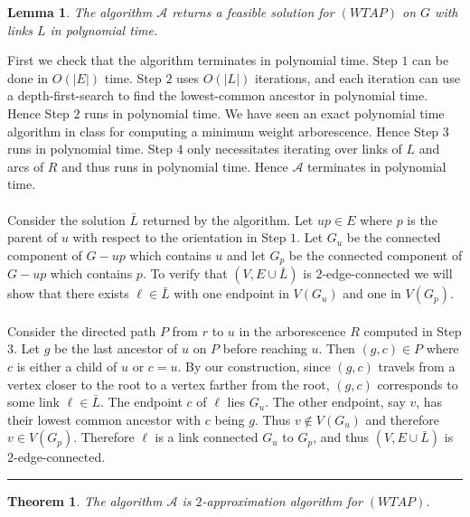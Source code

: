 \documentclass[letterpaper,12pt,oneside,onecolumn]{article}
\newcommand{\cA}{\mathcal{A}} \newcommand{\cB}{\mathcal{B}}
\newenvironment{proof}{{\bf Proof:  }}{\hfill\rule{2mm}{2mm}}
\newtheorem{lemma}[fact]{Lemma}
\newtheorem{theorem}[fact]{Theorem}
\begin{document}
\begin{lemma}\label{lemma:3a-poly}
The algorithm $\cA$ returns a feasible solution for $(WTAP)$ on $G$ with links $L$ in polynomial time.
\end{lemma}
\begin{proof}
First we check that the algorithm terminates in polynomial time. Step $1$ can be done in $O(|E|)$ time. Step $2$ uses $O(|L|)$ iterations, and each iteration can use a depth-first-search to find the lowest-common ancestor in polynomial time. Hence Step $2$ runs in polynomial time. We have seen an exact polynomial time algorithm in class for computing a minimum weight arborescence. Hence Step $3$ runs in polynomial time. Step $4$ only necessitates iterating over links of $L$ and arcs of $R$ and thus runs in polynomial time. Hence $\cA$ terminates in polynomial time.
\paragraph{}
Consider the solution $\bar{L}$ returned by the algorithm. Let $up \in E$ where $p$ is the parent of $u$ with respect to the orientation in Step $1$. Let $G_u$ be the connected component of $G-up$ which contains $u$ and let $G_p$ be the connected component of $G-up$ which contains $p$. To verify that $(V, E \cup \bar{L})$ is $2$-edge-connected we will show that there exists $\ell \in \bar{L}$ with one endpoint in $V(G_u)$ and one in $V(G_p)$.
\paragraph{}
Consider the directed path $P$ from $r$ to $u$ in the arborescence $R$ computed in Step $3$. Let $g$ be the last ancestor of $u$ on $P$ before reaching $u$. Then $(g,c) \in P$ where $c$ is either a child of $u$ or $c=u$. By our construction, since $(g,c)$ travels from a vertex closer to the root to a vertex farther from the root, $(g,c)$ corresponds to some link $\ell \in \bar{L}$. The endpoint $c$ of $\ell$ lies $G_u$. The other endpoint, say $v$, has their lowest common ancestor with $c$ being $g$. Thus $v \not \in V(G_u)$ and therefore $v \in V(G_p)$. Therefore $\ell$ is a link connected $G_u$ to $G_p$, and thus $(V, E \cup \bar{L})$ is $2$-edge-connected.
\end{proof}
\begin{theorem}
The algorithm $\cA$ is $2$-approximation algorithm for $(WTAP)$.
\end{theorem}
\end{document}
